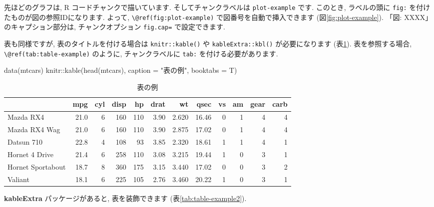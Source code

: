 \documentclass[
]{ltjsarticle}
\newenvironment{Shaded}{\begin{snugshade}}{\end{snugshade}}
\newcommand{\AttributeTok}[1]{\textcolor[rgb]{0.77,0.63,0.00}{#1}}
\newcommand{\FunctionTok}[1]{\textcolor[rgb]{0.00,0.00,0.00}{#1}}
\newcommand{\NormalTok}[1]{#1}
\newcommand{\SpecialCharTok}[1]{\textcolor[rgb]{0.00,0.00,0.00}{#1}}
\newcommand{\StringTok}[1]{\textcolor[rgb]{0.31,0.60,0.02}{#1}}
\begin{document}
先ほどのグラフは, R コードチャンクで描いています. そしてチャンクラベルは \texttt{plot-example} です. このとき, ラベルの頭に \texttt{fig:} を付けたものが図の参照IDになります. よって, \texttt{\textbackslash{}@ref(fig:plot-example)} で図番号を自動で挿入できます (図\ref{fig:plot-example}). 「図: XXXX」のキャプション部分は, チャンクオプション \texttt{fig.cap=} で設定できます.

表も同様ですが, 表のタイトルを付ける場合は \texttt{knitr::kable()} や \texttt{kableExtra::kbl()} が必要になります (表\ref{tab:table-example}). 表を参照する場合, \texttt{\textbackslash{}@ref(tab:table-example)} のように, チャンクラベルに \texttt{tab:} を付ける必要があります.

\begin{Shaded}
\begin{Highlighting}[numbers=left,,]
\FunctionTok{data}\NormalTok{(mtcars)}
\NormalTok{knitr}\SpecialCharTok{::}\FunctionTok{kable}\NormalTok{(}\FunctionTok{head}\NormalTok{(mtcars), }\AttributeTok{caption =} \StringTok{"表の例"}\NormalTok{, }\AttributeTok{booktabs =}\NormalTok{ T)}
\end{Highlighting}
\end{Shaded}

\begin{table}

\caption{\label{tab:table-example}表の例}
\centering
\begin{tabular}{lrrrrrrrrrrr}
\toprule
  & mpg & cyl & disp & hp & drat & wt & qsec & vs & am & gear & carb\\
\midrule
Mazda RX4 & 21.0 & 6 & 160 & 110 & 3.90 & 2.620 & 16.46 & 0 & 1 & 4 & 4\\
Mazda RX4 Wag & 21.0 & 6 & 160 & 110 & 3.90 & 2.875 & 17.02 & 0 & 1 & 4 & 4\\
Datsun 710 & 22.8 & 4 & 108 & 93 & 3.85 & 2.320 & 18.61 & 1 & 1 & 4 & 1\\
Hornet 4 Drive & 21.4 & 6 & 258 & 110 & 3.08 & 3.215 & 19.44 & 1 & 0 & 3 & 1\\
Hornet Sportabout & 18.7 & 8 & 360 & 175 & 3.15 & 3.440 & 17.02 & 0 & 0 & 3 & 2\\
\addlinespace
Valiant & 18.1 & 6 & 225 & 105 & 2.76 & 3.460 & 20.22 & 1 & 0 & 3 & 1\\
\bottomrule
\end{tabular}
\end{table}

\textbf{kableExtra} パッケージがあると, 表を装飾できます (表\ref{tab:table-example2}).
\end{document}
